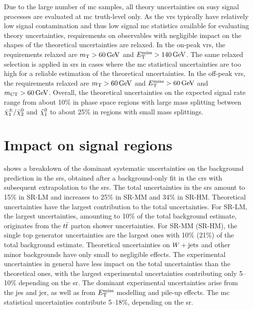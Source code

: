Due to the large number of \gls{mc} samples, all theory uncertainties on \gls{susy} signal processes are evaluated at \gls{mc} truth-level only.
As the \glspl{vr} typically have relatively low signal contamination and thus low signal \gls{mc} statistics available for evaluating theory uncertainties, requirements on observables with negligible impact on the shapes of the theoretical uncertainties are relaxed.
In the on-peak \glspl{vr}, the requirements relaxed are $\mt>\SI{60}{\GeV}$ and $\etmiss > \SI{140}{\GeV}$.
The same relaxed selection is applied in \glspl{sr} in cases where the \gls{mc} statistical uncertainties are too high for a reliable estimation of the theoretical uncertainties.
In the off-peak \glspl{vr}, the requirements relaxed are $\mt>\SI{60}{\GeV}$ and $\etmiss>\SI{60}{\GeV}$ and $\mct>\SI{60}{\GeV}$.
Overall, the theoretical uncertainties on the expected signal rate range from about 10\% in phase space regions with large mass splitting between $\tilde{\chi}_1^\pm/\tilde{\chi}_2^0$ and $\tilde{\chi}_1^0$ to about 25\% in regions with small mass splittings.
 
 
\section{Impact on signal regions}

 shows a breakdown of the dominant systematic uncertainties on the background prediction in the \glspl{sr}, obtained after a background-only fit in the \glspl{cr} with subsequent extrapolation to the \glspl{sr}.
The total uncertainties in the \glspl{sr} amount to 15\% in SR-LM and increases to 25\% in SR-MM and 34\% in SR-HM. Theoretical uncertainties have the largest contribution to the total uncertainties.
For SR-LM, the largest uncertainties, amounting to 10\% of the total background estimate, originates from the $t\bar{t}$ parton shower uncertainties.
For SR-MM (SR-HM), the single top generator uncertainties are the largest ones with 10\% (21\%) of the total background estimate.
Theoretical uncertainties on $W+\mathrm{jets}$ and other minor backgrounds have only small to negligible effects.
The experimental uncertainties in general have less impact on the total uncertainties than the theoretical ones, with the largest experimental uncertainties contributing only 5--10\% depending on the \gls{sr}.
The dominant experimental uncertainties arise from the \gls{jes} and \gls{jer}, as well as from $E_{\textrm{T}}^{\textrm{miss}}$ modelling and pile-up effects.
The \gls{mc} statistical uncertainties contribute 5--18\%, depending on the \gls{sr}.  


